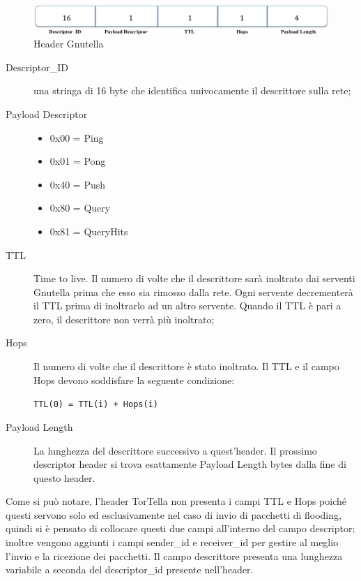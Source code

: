\begin{figure}[htb]
\begin{center}
\includegraphics[scale=0.38]{etc/gnutellaheader.jpg}
\caption{Header Gnutella}
\label{gnutellaheader}
\end{center}
\end{figure}
\begin{description}
\item[Descriptor\_ID] una stringa di 16 byte che identifica univocamente il descrittore sulla rete;
\item[Payload Descriptor]
\begin{itemize}
	\item 0x00 = Ping
	\item 0x01 = Pong
	\item 0x40 = Push
	\item 0x80 = Query
	\item 0x81 = QueryHits	
\end{itemize}
\item[TTL] Time to live. Il numero di volte che il descrittore sarà inoltrato dai serventi Gnutella prima che esso sia rimosso dalla rete. Ogni servente decrementerà il TTL prima di inoltrarlo ad un altro servente. Quando il TTL è pari a zero, il descrittore non verrà più inoltrato;
\item[Hops] Il numero di volte che il descrittore è stato inoltrato. Il TTL e il campo Hops devono soddisfare la seguente condizione: 
\begin{center}
\texttt{TTL(0) = TTL(i)  + Hops(i)}
\end{center}
\item[Payload Length] La lunghezza del descrittore successivo a quest’header. Il prossimo descriptor header si trova esattamente Payload Length bytes dalla fine di questo header.
\end{description}
Come si può notare, l’header TorTella non presenta i campi TTL e Hops poiché questi servono solo ed esclusivamente nel caso di invio di pacchetti di flooding, quindi si è pensato di collocare questi due campi all’interno del campo descriptor; inoltre vengono aggiunti i campi sender\_id e receiver\_id per gestire al meglio l’invio e la ricezione dei pacchetti. Il campo descrittore presenta una lunghezza variabile a seconda del descriptor\_id presente nell’header.